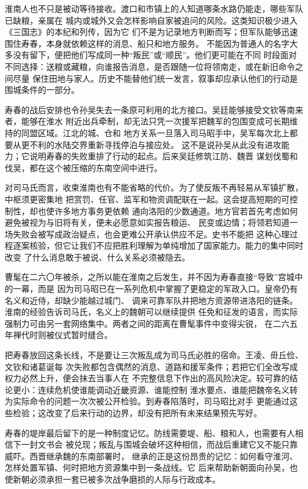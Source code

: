 淮南人也不只是被动等待接收。渡口和市镇上的人知道哪条水路仍能走，哪些军队已缺粮，亲属在
城内或城外又会怎样影响自家被追问的风险。这类知识极少进入《三国志》的本纪和列传，因为它
们不是为记录地方判断而写；但军队能够迅速围住寿春，本身就依赖这样的消息、船只和地方服务。
不能因为普通人的名字大多没有留下，便把他们写成同一种“叛民”或“顺民”。他们更可能在不同
时段面对不同选择：送粮或藏粮，向谁报告消息，是否跟随一位将领南走，或在新旧命令之间尽量
保住田地与家人。历史不能替他们统一发言，叙事却应承认他们的行动是围城条件的一部分。

寿春的战后安排也令孙吴失去一条原可利用的北方接口。吴廷能够接受文钦等南来者，能够在淮水
附近出兵牵制，却无法只凭一次援军把魏军的包围变成可长期维持的同盟区域。江北的城、仓和
地方关系一旦落入司马昭手中，吴军每次北上都要从更不利的水陆交界重新寻找停泊与接应处。
这不是说孙吴从此没有进攻能力；它说明寿春的失败重排了行动的起点。后来吴廷修筑江防、魏晋
谋划伐蜀和伐吴，都在这个被压缩的东南空间中进行。

对司马氏而言，收束淮南也有不能省略的代价。为了使反叛不再轻易从军镇扩散，中枢须更密集地
把赏罚、任官、监军和物资调配联在一起。这会提高短期的可控制性，却也使许多地方事务更依赖
通向洛阳的少数通道。地方官若首先考虑如何避免被视为与旧将有关，便未必愿意如实报告粮运、
民变或边情；将领若知道一场失败会被写成政治疑点，也会更难公开承认供应不足。史书不能把
这种心理过程逐案核验，但它让我们不应把胜利理解为单纯增加了国家能力。能力的集中同时改变
了什么消息敢于被说、什么关系必须被隐去。

曹髦在二六〇年被杀，之所以能在淮南之后发生，并不因为寿春直接“导致”宫城中的一幕，而是
因为司马昭已在一系列危机中掌握了更稳定的军政入口。皇帝仍有名义和近侍，却缺少能越过城门、
调来可靠军队并把地方资源带进洛阳的链条。淮南的经验告诉司马氏，名义上的魏朝可以继续提供
任免和征发的语言，而实际强制力可由另一套网络集中。两者之间的距离在曹髦事件中变得尖锐，
在二六五年禅代时则被仪式暂时缝合。

把寿春放回这条长线，不是要让三次叛乱成为司马氏必胜的宿命。王凌、毌丘俭、文钦和诸葛诞每
次失败都包含偶然的消息、道路和援军条件；若把它们全改写成权力必然上升，便会抹去当事人在
不完整信息下作出的高风险决定。较可靠的结论更小：连续危机使谁能调动近畿资源、谁能控制
淮水要点、谁能把魏帝名义转为实际命令的问题一次次被公开检验。到寿春陷落时，司马昭比对手
更能通过这些检验；这改变了后来行动的边界，却没有把所有未来结果预先写好。

寿春的堤岸最后留下的是一种制度记忆。防线需要堤、船、粮和人，也需要有人相信下一封文书会
被兑现；叛乱与围城会破坏这种相信，而战后重建它又不能只靠威吓。西晋继承魏的东南部署时，
继承的正是这份昂贵的记忆：如何看守淮河、怎样处置军镇、何时把地方资源集中到一条战线。它
后来帮助新朝面向孙吴，也使新朝必须承担一套已被多次战争磨损的人际与行政成本。
